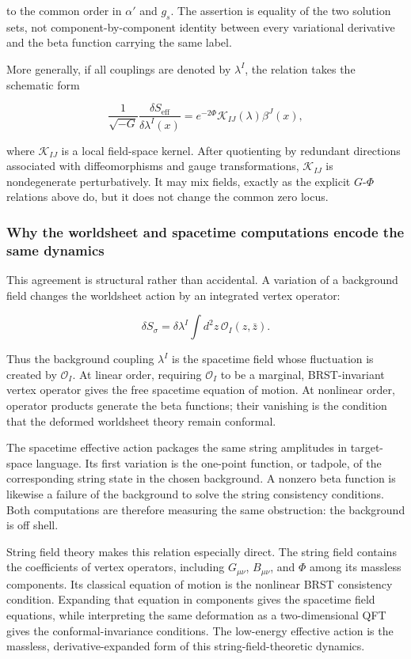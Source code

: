 \documentclass[
  10pt,
  a4paper,
  openany]{book}
\begin{document}
to the common order in \(\alpha'\) and \(g_s\). The assertion is
equality of the two solution sets, not component-by-component identity
between every variational derivative and the beta function carrying the
same label.

More generally, if all couplings are denoted by \(\lambda^I\), the
relation takes the schematic form

\[
\frac{1}{\sqrt{-G}}\frac{\delta S_{\mathrm{eff}}}{\delta\lambda^I(x)}
=e^{-2\Phi}\mathcal K_{IJ}(\lambda)\beta^J(x),
\]

where \(\mathcal K_{IJ}\) is a local field-space kernel. After
quotienting by redundant directions associated with diffeomorphisms and
gauge transformations, \(\mathcal K_{IJ}\) is nondegenerate
perturbatively. It may mix fields, exactly as the explicit
\(G\)-\(\Phi\) relations above do, but it does not change the common
zero locus.

\subsubsection{Why the worldsheet and spacetime computations encode the
same
dynamics}\label{why-the-worldsheet-and-spacetime-computations-encode-the-same-dynamics}

This agreement is structural rather than accidental. A variation of a
background field changes the worldsheet action by an integrated vertex
operator:

\[
\delta S_\sigma
=\delta\lambda^I\int d^2z\,\mathcal O_I(z,\bar z).
\]

Thus the background coupling \(\lambda^I\) is the spacetime field whose
fluctuation is created by \(\mathcal O_I\). At linear order, requiring
\(\mathcal O_I\) to be a marginal, BRST-invariant vertex operator gives
the free spacetime equation of motion. At nonlinear order, operator
products generate the beta functions; their vanishing is the condition
that the deformed worldsheet theory remain conformal.

The spacetime effective action packages the same string amplitudes in
target-space language. Its first variation is the one-point function, or
tadpole, of the corresponding string state in the chosen background. A
nonzero beta function is likewise a failure of the background to solve
the string consistency conditions. Both computations are therefore
measuring the same obstruction: the background is off shell.

String field theory makes this relation especially direct. The string
field contains the coefficients of vertex operators, including
\(G_{\mu\nu}\), \(B_{\mu\nu}\), and \(\Phi\) among its massless
components. Its classical equation of motion is the nonlinear BRST
consistency condition. Expanding that equation in components gives the
spacetime field equations, while interpreting the same deformation as a
two-dimensional QFT gives the conformal-invariance conditions. The
low-energy effective action is the massless, derivative-expanded form of
this string-field-theoretic dynamics.
\end{document}
